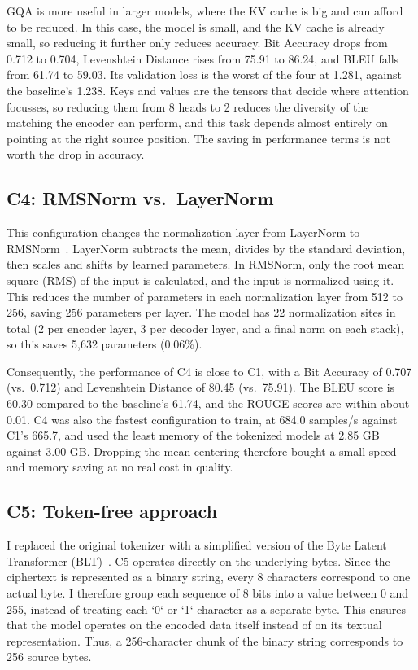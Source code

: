 \documentclass[12pt]{article}
\begin{document}
GQA is more useful in larger models, where the KV cache is big and can afford to
be reduced. In this case, the model is small, and the KV cache is already small,
so reducing it further only reduces accuracy. Bit Accuracy drops from 0.712 to
0.704, Levenshtein Distance rises from 75.91 to 86.24, and BLEU falls from 61.74
to 59.03. Its validation loss is the worst of the four at 1.281, against the
baseline's 1.238. Keys and values are the tensors that decide where
attention focusses, so reducing them from 8 heads to 2 reduces the diversity of the
matching the encoder can perform, and this task depends almost entirely on
pointing at the right source position. The saving in performance terms is not 
worth the drop in accuracy.

\subsection{C4: RMSNorm vs.\ LayerNorm}

This configuration changes the normalization layer from LayerNorm to
RMSNorm~\cite{zhang2019rmsnorm}.
LayerNorm subtracts the mean, divides by the standard deviation, then scales and
shifts by learned parameters. In RMSNorm, only the root mean square (RMS) of the
input is calculated, and the input is normalized using it. This reduces the
number of parameters in each normalization layer from 512 to 256, saving 256
parameters per layer. The model has 22 normalization sites in total (2 per
encoder layer, 3 per decoder layer, and a final norm on each stack), so this
saves 5,632 parameters (0.06\%).

Consequently, the performance of C4 is close to C1, with a Bit Accuracy of 0.707
(vs.\ 0.712) and Levenshtein Distance of 80.45 (vs.\ 75.91). The BLEU score is 60.30
compared to the baseline's 61.74, and the ROUGE scores are within about 0.01.
C4 was also the fastest configuration to train, at 684.0 samples/s against C1's 665.7, 
and used the least memory of the tokenized models at 2.85 GB against 3.00 GB. 
Dropping the mean-centering therefore bought a small speed and memory saving at no 
real cost in quality.

\subsection{C5: Token-free approach}

I replaced the original tokenizer with a simplified version of the Byte Latent
Transformer (BLT)~\cite{pagnoni2024blt}. C5 operates directly on the underlying bytes. 
Since the ciphertext is represented as a binary string, every 8 characters correspond to one
actual byte. I therefore group each sequence of 8 bits into a value between 0 and 255,
instead of treating each `0` or `1` character as a separate byte. This ensures that
the model operates on the encoded data itself instead of on its textual representation.
Thus, a 256-character chunk of the binary string corresponds to 256 source bytes.
\end{document}
